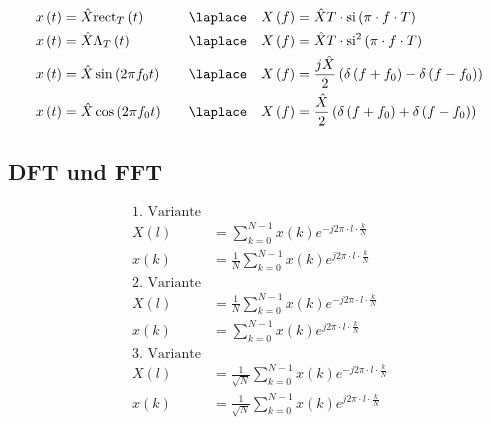 \begin{boxleft}
\end{boxleft}\begin{boxrightshaded}
\begin{align*}
x\left(t\right)&=\hat{X}\mathrm{rect}_{T}\left(t\right)\quad&\laplace\quad X\left(f\right)&=\hat{X}T\cdot\mathrm{si}\left(\pi\cdot f\cdot T\right)\\
x\left(t\right)&=\hat{X}\Lambda_{T}\left(t\right)\quad&\laplace\quad X\left(f\right)&=\hat{X}T\cdot\mathrm{si}^2\left(\pi\cdot f\cdot T\right)\\
x\left(t\right)&=\hat{X}\sin\left(2\pi f_0 t\right)\quad&\laplace\quad X\left(f\right)&=\frac{j\hat{X}}{2}\left(\delta\left(f+f_0\right)-\delta\left(f-f_0\right)\right)\\
x\left(t\right)&=\hat{X}\cos\left(2\pi f_0 t\right)\quad&\laplace\quad X\left(f\right)&=\frac{\hat{X}}{2}\left(\delta\left(f+f_0\right)+\delta\left(f-f_0\right)\right)
\end{align*}
\end{boxrightshaded}

\subsection{DFT und FFT}

\begin{boxleft}
\end{boxleft}\begin{boxrightshaded}
\begin{align*}
\text{1. Variante}\\
X\left(l\right)&=\sum_{k=0}^{N-1}x\left(k\right)e^{-j2\pi\cdot l \cdot\frac{k}{N}}\\
x\left(k\right)&=\frac{1}{N}\sum_{k=0}^{N-1}x\left(k\right)e^{j2\pi\cdot l \cdot\frac{k}{N}}\\
\text{2. Variante}\\
X\left(l\right)&=\frac{1}{N}\sum_{k=0}^{N-1}x\left(k\right)e^{-j2\pi\cdot l \cdot\frac{k}{N}}\\
x\left(k\right)&=\sum_{k=0}^{N-1}x\left(k\right)e^{j2\pi\cdot l \cdot\frac{k}{N}}\\
\text{3. Variante}\\
X\left(l\right)&=\frac{1}{\sqrt{N}}\sum_{k=0}^{N-1}x\left(k\right)e^{-j2\pi\cdot l \cdot\frac{k}{N}}\\
x\left(k\right)&=\frac{1}{\sqrt{N}}\sum_{k=0}^{N-1}x\left(k\right)e^{j2\pi\cdot l \cdot\frac{k}{N}}
\end{align*}
\end{boxrightshaded}


